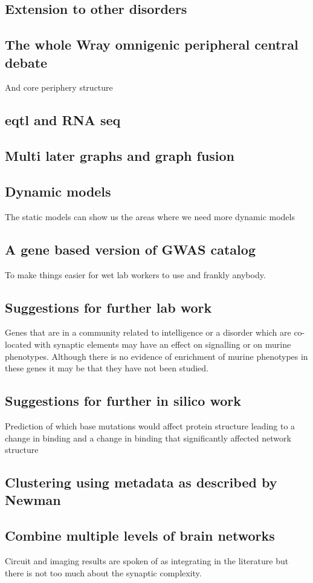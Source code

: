  \subsection{Extension to other disorders}
 \subsection{The whole Wray omnigenic peripheral central debate}
 And core periphery structure
 \subsection{eqtl and RNA seq}
 \subsection{Multi later graphs and graph fusion}
 \subsection{Dynamic models}
 The static models can show us the areas where we need more dynamic models 
 \subsection{A gene based version of GWAS catalog}
 To make things easier for wet lab workers to use and frankly anybody. 
 \subsection{Suggestions for further lab work}
 Genes that are in a community related to intelligence or a disorder which are co-located with synaptic elements may have an effect on signalling or on murine phenotypes. Although there is no evidence of enrichment of murine phenotypes in these genes it may be that they have not been studied. 
 
 \subsection{Suggestions for further in silico work}
 Prediction of which base mutations would affect protein structure leading to a change in binding and a change in binding that significantly affected network structure
 \subsection{Clustering using metadata as described by Newman}
 \subsection{Combine multiple levels of brain networks}
 Circuit and imaging results are spoken of as integrating in the literature but there is not too much about the synaptic complexity. 
